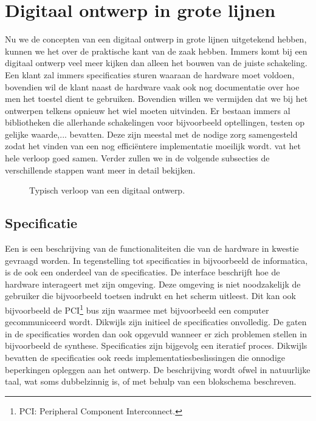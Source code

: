 \section{Digitaal ontwerp in grote lijnen}
Nu we de concepten van een digitaal ontwerp in grote lijnen uitgetekend hebben, kunnen we het over de praktische kant van de zaak hebben. Immers komt bij een digitaal ontwerp veel meer kijken dan alleen het bouwen van de juiste schakeling. Een klant zal immers specificaties sturen waaraan de hardware moet voldoen, bovendien wil de klant naast de hardware vaak ook nog documentatie over hoe men het toestel dient te gebruiken. Bovendien willen we vermijden dat we bij het ontwerpen telkens opnieuw het wiel moeten uitvinden. Er bestaan immers al bibliotheken die allerhande schakelingen voor bijvoorbeeld optellingen, testen op gelijke waarde,... bevatten. Deze zijn meestal met de nodige zorg samengesteld zodat het vinden van een nog effici\"entere implementatie moeilijk wordt.  vat het hele verloop goed samen. Verder zullen we in de volgende subsecties de verschillende stappen want meer in detail bekijken.
\begin{figure}
\centering
{}
\caption{Typisch verloop van een digitaal ontwerp.}
\end{figure}
\subsection{Specificatie}
\label{ss:specificatie}
Een  is een beschrijving van de functionaliteiten die van de hardware in kwestie gevraagd worden. In tegenstelling tot specificaties in bijvoorbeeld de informatica, is de  ook een onderdeel van de specificaties. De interface beschrijft hoe de hardware interageert met zijn omgeving. Deze omgeving is niet noodzakelijk de gebruiker die bijvoorbeeld toetsen indrukt en het scherm uitleest. Dit kan ook bijvoorbeeld de PCI\footnote{PCI: Peripheral Component Interconnect.} bus zijn waarmee met bijvoorbeeld een computer gecommuniceerd wordt. Dikwijls zijn initieel de specificaties onvolledig. De gaten in de specificaties worden dan ook opgevuld wanneer er zich problemen stellen in bijvoorbeeld de synthese. Specificaties zijn bijgevolg een iteratief proces. Dikwijls bevatten de specificaties ook reeds implementatiesbeslissingen die onnodige beperkingen opleggen aan het ontwerp. De beschrijving wordt ofwel in natuurlijke taal, wat soms dubbelzinnig is, of met behulp van een blokschema beschreven.
